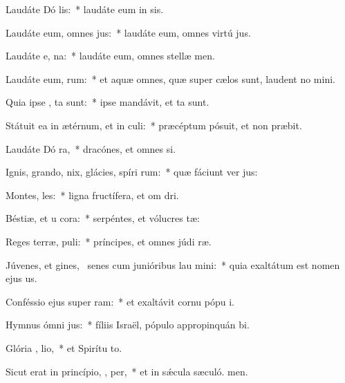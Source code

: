 \item Laudáte Dó  lis:~* laudáte eum in sis.
\item Laudáte eum, omnes  jus:~* laudáte eum, omnes virtú jus.
\item Laudáte e,   na:~* laudáte eum, omnes stellæ  men.
\item Laudáte eum,  rum:~* et aquæ omnes, quæ super cælos sunt, laudent no mini.
\item Quia ipse ,  ta sunt:~* ipse mandávit, et ta sunt.
\item Státuit ea in ætérnum, et in  culi:~* præcéptum pósuit, et non præbit.
\item Laudáte Dó  ra,~* dracónes, et omnes si.
\item Ignis, grando, nix, glácies, spíri rum:~* quæ fáciunt ver jus:
\item Montes,   les:~* ligna fructífera, et om dri.
\item Béstiæ, et u cora:~* serpéntes, et vólucres tæ:
\item Reges terræ,   puli:~* príncipes, et omnes júdi ræ.
\item Júvenes, et gines,~\pscross{} senes cum junióribus lau  mini:~* quia exaltátum est nomen ejus us.
\item Conféssio ejus super   ram:~* et exaltávit cornu pópu i.
\item Hymnus ómni  jus:~* fíliis Israël, pópulo appropinquán bi.
\item Glória ,  lio,~* et Spirítu to.
\item Sicut erat in princípio,  ,  per,~* et in sǽcula sæculó. men.
